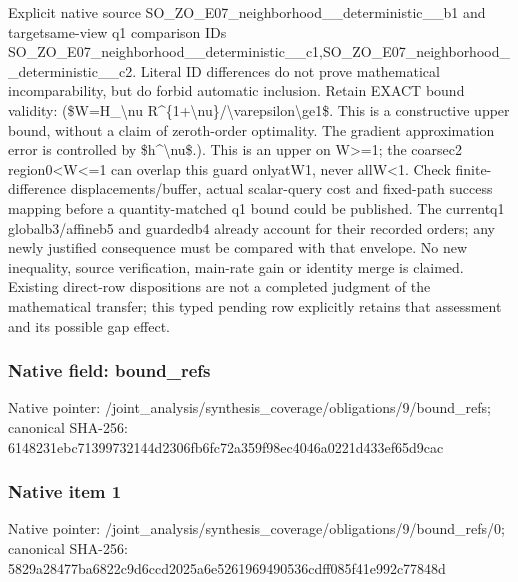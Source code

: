 \documentclass[10pt,a4paper]{article}
\begin{document}
\begingroup\raggedright\sloppy Explicit native source SO\_\allowbreak{}ZO\_\allowbreak{}E07\_\allowbreak{}neighborhood\_\allowbreak{}\_\allowbreak{}deterministic\_\allowbreak{}\_\allowbreak{}b1 and targetsame-view q1 comparison IDs SO\_\allowbreak{}ZO\_\allowbreak{}E07\_\allowbreak{}neighborhood\_\allowbreak{}\_\allowbreak{}deterministic\_\allowbreak{}\_\allowbreak{}c1,\allowbreak{}SO\_\allowbreak{}ZO\_\allowbreak{}E07\_\allowbreak{}neighborhood\_\allowbreak{}\_\allowbreak{}deterministic\_\allowbreak{}\_\allowbreak{}c2. Literal ID differences do not prove mathematical incomparability,\allowbreak{} but do forbid automatic inclusion. Retain EXACT bound validity:\allowbreak{} (\$W=\allowbreak{}H\_\allowbreak{}\textbackslash{}nu R\textasciicircum{}\{1+\textbackslash{}nu\}/\allowbreak{}\textbackslash{}varepsilon\textbackslash{}ge1\$. This is a constructive upper bound,\allowbreak{} without a claim of zeroth-order optimality. The gradient approximation error is controlled by \$h\textasciicircum{}\textbackslash{}nu\$.). This is an upper on W>=\allowbreak{}1;\allowbreak{} the coarsec2 region0<W<=\allowbreak{}1 can overlap this guard onlyatW1,\allowbreak{} never allW<1. Check finite-difference displacements/\allowbreak{}buffer,\allowbreak{} actual scalar-query cost and fixed-path success mapping before a quantity-matched q1 bound could be published. The currentq1 globalb3/\allowbreak{}affineb5 and guardedb4 already account for their recorded orders;\allowbreak{} any newly justified consequence must be compared with that envelope. No new inequality,\allowbreak{} source verification,\allowbreak{} main-rate gain or identity merge is claimed. Existing direct-row dispositions are not a completed judgment of the mathematical transfer;\allowbreak{} this typed pending row explicitly retains that assessment and its possible gap effect.\par\endgroup

\subsubsection{Native field: bound\_\allowbreak{}refs}
Native pointer: /joint\_\allowbreak{}analysis/synthesis\_\allowbreak{}coverage/obligations/9/bound\_\allowbreak{}refs; canonical SHA-256: 6148231ebc71399732144d2306fb6fc72a359f98ec4046a0221d433ef65d9cac

\subsubsection{Native item 1}
Native pointer: /joint\_\allowbreak{}analysis/synthesis\_\allowbreak{}coverage/obligations/9/bound\_\allowbreak{}refs/0; canonical SHA-256: 5829a28477ba6822c9d6ccd2025a6e5261969490536cdff085f41e992c77848d
\end{document}

